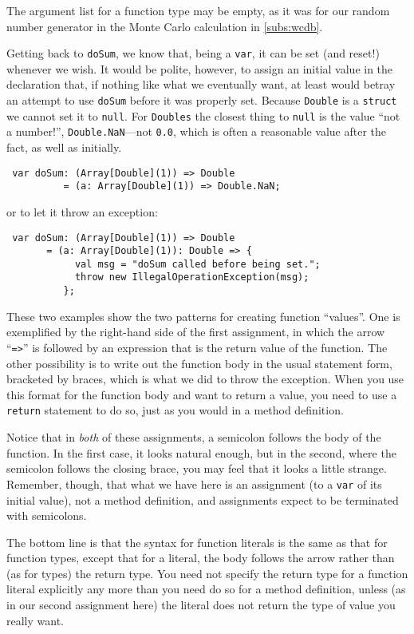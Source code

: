 The argument list for a function type may be empty, as it was for our random
number generator in the Monte Carlo calculation in \ref{subs:wcdb}.

Getting back to {\tt doSum}, we know that, being a {\tt var}, it can be set (and
reset!) whenever we wish. It would be polite, however, to assign an initial
value in the declaration that, if nothing like what we eventually want, at least
would betray an attempt to use {\tt doSum} before it was properly set.
Because {\tt Double} is a {\tt struct} we cannot set it to {\tt null}.
For {\tt Doubles} the closest thing to {\tt null} is the value ``not a number!'',
{\tt Double.NaN}---not {\tt 0.0}, which is often
a reasonable value after the fact, as well as initially.
\begin{verbatim}
 var doSum: (Array[Double](1)) => Double
          = (a: Array[Double](1)) => Double.NaN;
\end{verbatim}
or to let it throw an exception:
\begin{verbatim}
 var doSum: (Array[Double](1)) => Double
       = (a: Array[Double](1)): Double => {
            val msg = "doSum called before being set.";
            throw new IllegalOperationException(msg);
          };
\end{verbatim}
These two examples show the two patterns for creating function ``values''.
One is exemplified by the right-hand side of the first assignment, in which
the arrow ``{\tt =>}'' is followed by an expression that is the return value of
the function.  The other possibility is to write out the function body in the
usual statement form, bracketed by braces, which is what we did to throw the
exception.  When you use this format for the function body and want to return a
value, you need to use a {\tt return} statement to do so, just as you would in
a method definition.

Notice that in {\em both} of these assignments, a semicolon follows the body of
the function.  In the first case, it looks natural enough, but in the second, where
the semicolon follows the closing brace, you may feel that it looks
a little strange.  Remember, though, that what we have here is an assignment
(to a {\tt var} of its initial value), not a method definition, 
and assignments expect to be terminated with semicolons.  

The bottom line is that the syntax for function literals is the same as that for
function types, except that for a literal, the body follows the arrow rather
than (as for types) the return type. You need not specify
the return type for a function literal explicitly any more than you need do so
for a method definition, unless (as in our second assignment here) the
literal does not return the type of value you really want.

